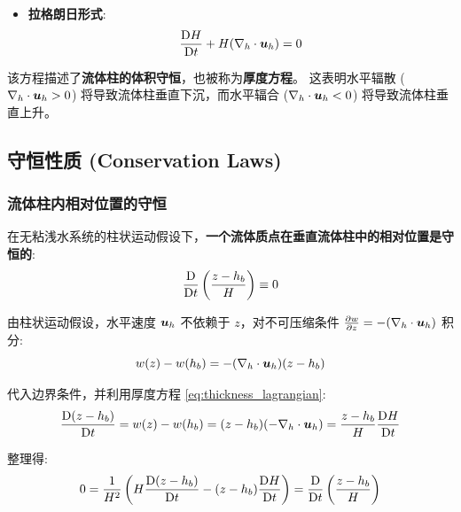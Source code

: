 \begin{enumerate}
\begin{itemize}
        \item \textbf{拉格朗日形式}:
        \begin{equation}
            \frac{\mathrm{D} H}{\mathrm{D} t} + H (\nabla_h \cdot \bm{u}_h) = 0
            \label{eq:thickness_lagrangian}
        \end{equation}
    \end{itemize}

    该方程描述了\textbf{流体柱的体积守恒}，也被称为\textbf{厚度方程}。
    这表明水平辐散 ($\nabla_h \cdot \bm{u}_h > 0$) 将导致流体柱垂直下沉，而水平辐合 ($\nabla_h \cdot \bm{u}_h < 0$) 将导致流体柱垂直上升。
\end{enumerate}

\subsection{守恒性质 (Conservation Laws)}

\subsubsection{流体柱内相对位置的守恒}

在无粘浅水系统的柱状运动假设下，\textbf{一个流体质点在垂直流体柱中的相对位置是守恒的}:
\begin{equation}
    \frac{\mathrm{D} }{\mathrm{D} t} \left(\frac{z - h_b}{H}\right) \equiv 0
    \label{eq:relative_position_conservation}
\end{equation}

\begin{proofbox}
    由柱状运动假设，水平速度 $\bm{u}_h$ 不依赖于 $z$，对不可压缩条件 $\pde{w}{z} = -(\nabla_h \cdot \vel_h)$ 积分:
    \begin{equation*}
        w(z) - w(h_b) = -(\nabla_h \cdot \bm{u}_h)(z - h_b)
    \end{equation*}

    代入边界条件，并利用厚度方程 \eqref{eq:thickness_lagrangian}:
    \begin{equation*}
        \frac{\mathrm{D} (z - h_b)}{\mathrm{D} t} = w(z) - w(h_b) = (z - h_b) (-\nabla_h \cdot \bm{u}_h) = \frac{z - h_b}{H} \frac{\mathrm{D} H}{\mathrm{D} t}
    \end{equation*}

    整理得:
    \begin{equation*}
        0 = \frac{1}{H^2} \left(H \frac{\mathrm{D} (z - h_b)}{\mathrm{D} t} - (z - h_b) \frac{\mathrm{D} H}{\mathrm{D} t}\right) = \frac{\mathrm{D} }{\mathrm{D} t} \left(\frac{z - h_b}{H}\right)
    \end{equation*}
\end{proofbox}

